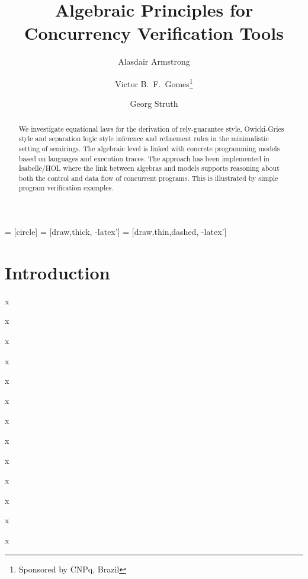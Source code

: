 \documentclass{llncs}
\begin{document}
 = [circle]
 = [draw,thick, -latex']
 = [draw,thin,dashed, -latex']

\title{Algebraic Principles for Concurrency Verification Tools}

\author{Alasdair Armstrong \and Victor B.~F.~Gomes\thanks{Sponsored by CNPq, Brazil}  \and Georg Struth}


\maketitle

\begin{abstract}
We investigate equational laws for the derivation of rely-guarantee
style, Owicki-Gries style and separation logic style inference and
refinement rules in the minimalistic setting of semirings. The
algebraic level is linked with concrete programming models based on
languages and execution traces. The approach has been implemented in
Isabelle/HOL where the link between algebras and models supports
reasoning about both the control and data flow of concurrent
programs. This is illustrated by simple program verification examples.
\end{abstract}

\pagestyle{plain}

\section{Introduction}

\cite{hoare_concurrent_2011}
\cite{kozen_completeness_1994}
\cite{kozen_kleene_1997}
\cite{armstrong_kleene_2013}
\cite{nipkow_isabelle/hol:_2002}

x

x

x

x

x

x

x

x

x

x

x

x

x
\end{document}
